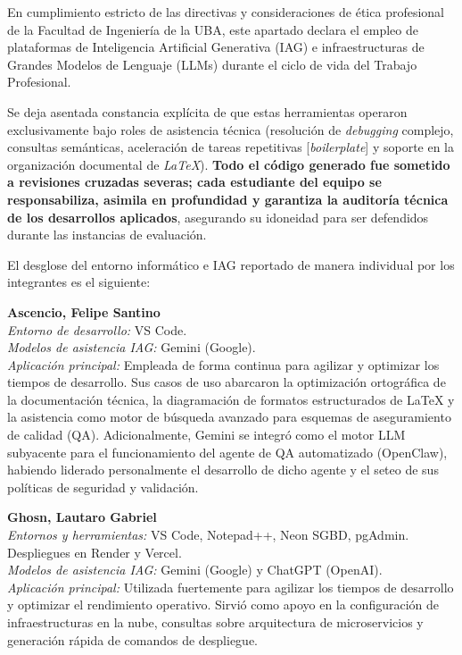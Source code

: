 En cumplimiento estricto de las directivas y consideraciones de ética profesional de la Facultad de Ingeniería de la UBA, este apartado declara el empleo de plataformas de Inteligencia Artificial Generativa (IAG) e infraestructuras de Grandes Modelos de Lenguaje (LLMs) durante el ciclo de vida del Trabajo Profesional.

Se deja asentada constancia explícita de que estas herramientas operaron exclusivamente bajo roles de asistencia técnica (resolución de \textit{debugging} complejo, consultas semánticas, aceleración de tareas repetitivas [\textit{boilerplate}] y soporte en la organización documental de \textit{LaTeX}). \textbf{Todo el código generado fue sometido a revisiones cruzadas severas; cada estudiante del equipo se responsabiliza, asimila en profundidad y garantiza la auditoría técnica de los desarrollos aplicados}, asegurando su idoneidad para ser defendidos durante las instancias de evaluación.

El desglose del entorno informático e IAG reportado de manera individual por los integrantes es el siguiente:

\vspace{0.3cm}

\noindent \textbf{Ascencio, Felipe Santino} \\
\textit{Entorno de desarrollo:} VS Code. \\
\textit{Modelos de asistencia IAG:} Gemini (Google). \\
\textit{Aplicación principal:} Empleada de forma continua para agilizar y optimizar los tiempos de desarrollo. Sus casos de uso abarcaron la optimización ortográfica de la documentación técnica, la diagramación de formatos estructurados de LaTeX y la asistencia como motor de búsqueda avanzado para esquemas de aseguramiento de calidad (QA). Adicionalmente, Gemini se integró como el motor LLM subyacente para el funcionamiento del agente de QA automatizado (OpenClaw), habiendo liderado personalmente el desarrollo de dicho agente y el seteo de sus políticas de seguridad y validación.

\vspace{0.3cm}

\noindent \textbf{Ghosn, Lautaro Gabriel} \\
\textit{Entornos y herramientas:} VS Code, Notepad++, Neon SGBD, pgAdmin. Despliegues en Render y Vercel. \\
\textit{Modelos de asistencia IAG:} Gemini (Google) y ChatGPT (OpenAI). \\
\textit{Aplicación principal:} Utilizada fuertemente para agilizar los tiempos de desarrollo y optimizar el rendimiento operativo. Sirvió como apoyo en la configuración de infraestructuras en la nube, consultas sobre arquitectura de microservicios y generación rápida de comandos de despliegue.

